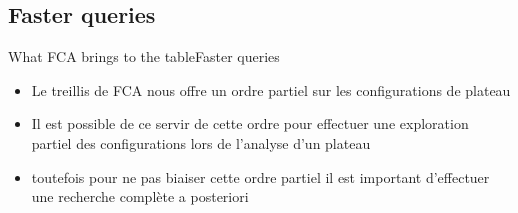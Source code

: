 \subsection{Faster queries}
\begin{frame}{What FCA brings to the table}{Faster queries}


  \begin{itemize}
    \item Le treillis de FCA nous offre un ordre partiel sur les
      configurations de plateau
    \item Il est possible de ce servir de cette ordre pour effectuer
      une exploration partiel des configurations lors de l'analyse
      d'un plateau
    \item toutefois pour ne pas biaiser cette ordre partiel il est
      important d'effectuer une recherche complète a posteriori
    
  \end{itemize}



\end{frame}

%
